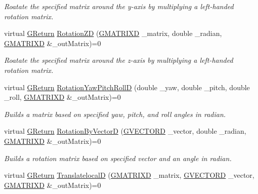 \begin{DoxyCompactItemize}
\begin{DoxyCompactList}\small\item\em Roatate the specified matrix around the y-\/axis by multiplying a left-\/handed rotation matrix. \end{DoxyCompactList}\item 
virtual \mbox{\hyperlink{namespaceGW_a67a839e3df7ea8a5c5686613a7a3de21}{G\+Return}} \mbox{\hyperlink{classGW_1_1MATH_1_1GMatrix_ae219f6b6aeddcd2969e5812c8e0a481c}{Rotation\+ZD}} (\mbox{\hyperlink{structGW_1_1MATH_1_1GMATRIXD}{G\+M\+A\+T\+R\+I\+XD}} \+\_\+matrix, double \+\_\+radian, \mbox{\hyperlink{structGW_1_1MATH_1_1GMATRIXD}{G\+M\+A\+T\+R\+I\+XD}} \&\+\_\+out\+Matrix)=0
\begin{DoxyCompactList}\small\item\em Roatate the specified matrix around the z-\/axis by multiplying a left-\/handed rotation matrix. \end{DoxyCompactList}\item 
virtual \mbox{\hyperlink{namespaceGW_a67a839e3df7ea8a5c5686613a7a3de21}{G\+Return}} \mbox{\hyperlink{classGW_1_1MATH_1_1GMatrix_ae63a0eacd6030eeed28dec461986e322}{Rotation\+Yaw\+Pitch\+RollD}} (double \+\_\+yaw, double \+\_\+pitch, double \+\_\+roll, \mbox{\hyperlink{structGW_1_1MATH_1_1GMATRIXD}{G\+M\+A\+T\+R\+I\+XD}} \&\+\_\+out\+Matrix)=0
\begin{DoxyCompactList}\small\item\em Builds a matrix based on specified yaw, pitch, and roll angles in radian. \end{DoxyCompactList}\item 
virtual \mbox{\hyperlink{namespaceGW_a67a839e3df7ea8a5c5686613a7a3de21}{G\+Return}} \mbox{\hyperlink{classGW_1_1MATH_1_1GMatrix_a7262ab71d767293693314c60076652fe}{Rotation\+By\+VectorD}} (\mbox{\hyperlink{structGW_1_1MATH_1_1GVECTORD}{G\+V\+E\+C\+T\+O\+RD}} \+\_\+vector, double \+\_\+radian, \mbox{\hyperlink{structGW_1_1MATH_1_1GMATRIXD}{G\+M\+A\+T\+R\+I\+XD}} \&\+\_\+out\+Matrix)=0
\begin{DoxyCompactList}\small\item\em Builds a rotation matrix based on specified vector and an angle in radian. \end{DoxyCompactList}\item 
virtual \mbox{\hyperlink{namespaceGW_a67a839e3df7ea8a5c5686613a7a3de21}{G\+Return}} \mbox{\hyperlink{classGW_1_1MATH_1_1GMatrix_a03adfd30119a70006679ee98a320591a}{TranslatelocalD}} (\mbox{\hyperlink{structGW_1_1MATH_1_1GMATRIXD}{G\+M\+A\+T\+R\+I\+XD}} \+\_\+matrix, \mbox{\hyperlink{structGW_1_1MATH_1_1GVECTORD}{G\+V\+E\+C\+T\+O\+RD}} \+\_\+vector, \mbox{\hyperlink{structGW_1_1MATH_1_1GMATRIXD}{G\+M\+A\+T\+R\+I\+XD}} \&\+\_\+out\+Matrix)=0

\end{DoxyCompactItemize}

